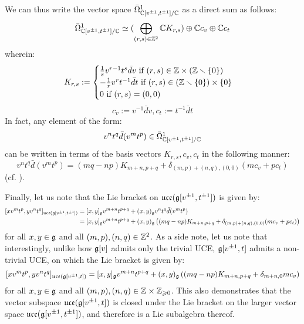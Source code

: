 \begin{example}
            We can thus write the vector space $\bar{\Omega}^1_{\mathbb{C}[v^{\pm 1}, t^{\pm 1}]/\mathbb{C}}$ as a direct sum as follows:
                $$\bar{\Omega}^1_{\mathbb{C}[v^{\pm 1}, t^{\pm 1}]/\mathbb{C}} \simeq ( \bigoplus_{(r, s) \in \mathbb{Z}^2} \mathbb{C} K_{r, s}) \oplus \mathbb{C} c_v \oplus \mathbb{C} c_t$$
            wherein:
                $$
                    K_{r, s} :=
                    \begin{cases}
                        \text{$\frac1s v^{r - 1} t^s \bar{d}v$ if $(r, s) \in \Z \x (\Z \setminus \{0\})$}
                        \\
                        \text{$-\frac1r v^r t^{-1} \bar{d}t$ if $(r, s) \in (\Z \setminus \{0\}) \x \{0\}$}
                        \\
                        \text{$0$ if $(r, s) = (0, 0)$}
                    \end{cases}
                $$
                $$c_v := v^{-1} \bar{d}v, c_t := t^{-1} \bar{d}t$$
            In fact, any element of the form:
                $$v^n t^q \bar{d}(v^m t^p) \in \bar{\Omega}^1_{\mathbb{C}[v^{\pm 1}, t^{\pm 1}]/\mathbb{C}}$$
            can be written in terms of the basis vectors $K_{r, s}, c_v, c_t$ in the following manner:
                $$v^n t^q \bar{d}(v^m t^p) = (mq - np) K_{m + n, p + q} + \delta_{(m, p) + (n, q), (0, 0)} ( m c_v + p c_t )$$
            (cf. \cite[p. 35]{wendlandt_formal_shift_operators_on_yangian_doubles}).

            Finally, let us note that the Lie bracket on $\mathfrak{uce}(\mathfrak{g}[v^{\pm 1}, t^{\pm 1}])$ is given by:
                $$
                    \begin{aligned}
                        [x v^m t^p, y v^n t^q]_{\uce(\g[v^{\pm 1}, t^{\pm 1}])} & = [x, y]_{\g} v^{m + n} t^{p + q} + (x, y)_{\g} v^n t^q \bar{d}(v^m t^p)
                        \\
                        & = [x, y]_{\g} v^{m + n} t^{p + q} + (x, y)_{\g} \left( (mq - np) K_{m + n, p + q} + \delta_{(m, p) + (n, q), (0, 0)} ( m c_v + p c_t ) \right)
                    \end{aligned}
                $$
            for all $x, y \in \mathfrak{g}$ and all $(m, p), (n, q) \in \mathbb{Z}^2$. As a side note, let us note that interestingly, unlike how $\mathfrak{g}[v]$ admits only the trivial UCE, $\mathfrak{g}[v^{\pm 1}, t]$ admits a non-trivial UCE, on which the Lie bracket is given by:
                $$[x v^m t^p, y v^n t^q]_{\mathfrak{uce}(\mathfrak{g}[v^{\pm 1}, t])} = [x, y]_{\mathfrak{g}} v^{m + n} t^{p + q} + (x, y)_{\mathfrak{g}} \left( (mq - np) K_{m + n, p + q} + \delta_{m + n, 0} m c_v \right)$$
            for all $x, y \in \mathfrak{g}$ and all $(m, p), (n, q) \in \Z \x \Z_{\geq 0}$. This also demonstrates that the vector subspace $\mathfrak{uce}(\mathfrak{g}[v^{\pm 1}, t])$ is closed under the Lie bracket on the larger vector space $\mathfrak{uce}(\mathfrak{g}[v^{\pm 1}, t^{\pm 1}])$, and therefore is a Lie subalgebra thereof.
        \end{example}
